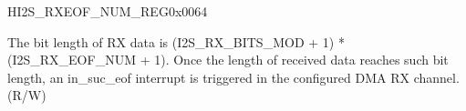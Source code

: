 \begin{register}{H}{I2S\_RXEOF\_NUM\_REG}{0x0064}\label{regdesc:I2SRXEOFNUMREG}
%
%
\regnewline%
\begin{regdesc}\begin{reglist}
\label{fielddesc:I2SRXEOFNUM}\item [I2S\_RX\_EOF\_NUM] The bit length of RX data is (I2S\_RX\_BITS\_MOD + 1) * (I2S\_RX\_EOF\_NUM + 1). Once the length of received data reaches such bit length, an in\_suc\_eof interrupt is triggered in the configured DMA RX channel. (R/W)
\end{reglist}\end{regdesc}
\end{register}


